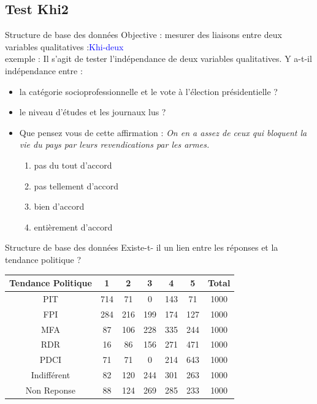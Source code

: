 \documentclass[11pt]{beamer}
\begin{document}
\subsection{Test Khi2}
\begin{frame}{Structure de base des données}
Objective : mesurer des liaisons entre deux variables qualitatives :\textcolor{blue}{Khi-deux}\\
exemple : 
Il s’agit de tester l’indépendance de deux variables qualitatives.
Y a-t-il indépendance entre :


\begin{itemize}
\item la catégorie socioprofessionnelle et le vote à l'élection
présidentielle ?
\item  le niveau d’études et les journaux lus ?

\item Que pensez vous de cette affirmation : \textit{On en a assez de ceux qui bloquent la vie du pays par leurs revendications par les armes.}

\begin{enumerate}
\item  pas du tout d'accord
\item pas tellement d'accord 
\item bien d'accord 
\item entièrement d'accord
\end{enumerate}
\end{itemize}

 
\end{frame}

\begin{frame}{Structure de base des données}
\centering
Existe-t- il un lien entre les réponses et la tendance politique ?   
\begin{table}
\begin{tabular}{|c|c|c|c|c|c|c|}
\hline 
Tendance Politique & 1 & 2 & 3 & 4 & 5 & Total \\ 
\hline 
PIT & 714 & 71 & 0 & 143 & 71 & 1000 \\ 
\hline 
FPI & 284 & 216 & 199 & 174 & 127 & 1000 \\ 
\hline 
MFA & 87 & 106 & 228 & 335 & 244 & 1000 \\ 
\hline 
RDR & 16 & 86 & 156 & 271 & 471 & 1000 \\ 
\hline 
PDCI & 71 & 71 & 0 & 214 & 643 & 1000 \\ 
\hline 
Indifférent & 82 & 120 & 244 & 301 & 263 & 1000 \\ 
\hline 
Non Reponse & 88 & 124 & 269 & 285 & 233 & 1000 \\ 
\hline 
\end{tabular} 
\end{table}

 
\end{frame}
\end{document}
